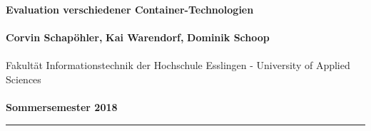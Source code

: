 \renewcommand{\footnoterule}{\hspace{-0.5cm}\rule{6cm}{1pt}{\vspace*{2pt}}}
\begin{center}
\newcommand{\SchapoehlerCorvinThema}{Evaluation verschiedener Container-Technologien}
		\baselineskip15pt
		\textbf{\textcolor{hs_dunkelblau}{\large{Evaluation verschiedener Container-Technologien}}}\\\ \\
		\baselineskip10pt
\newcommand{\SchapoehlerCorvin}{Corvin \newline Schapöhler}
		\textbf{\textcolor{hs_dunkelblau}{Corvin Schapöhler\label{SchapoehlerCorvin},}\hspace{.5cm}}
\textbf{\textcolor{hs_dunkelblau}{
Kai Warendorf,}}
\hspace{.5cm}\textbf{\textcolor{hs_dunkelblau}{
Dominik Schoop}}
\textcolor{hs_dunkelblau}{\\\ \\Fakultät Informationstechnik der Hochschule Esslingen - University of Applied Sciences}\\\ \\
\textcolor{hs_dunkelblau}{\textbf{Sommersemester 2018}}
\color{hs_dunkelblau}\rule{\linewidth}{1.5pt}
\end{center}
\setcounter{figure}{0}
\renewcommand{\bildI}{
 \begin{center}
 \begin{minipage}[t]{\linewidth}
 \begin{center}
  \includegraphics*[width=\linewidth, scale=1.1]
{../tmp/SchapoehlerCorvin/Corvin_Schapoehler_Bild01.png}
  \captionof{figure}{\fontspec{Lucida Sans} \footnotesize Virtualisierung durch VMs (links) im vergleich zu Isolation durch Container (recht)}
  \end{center}
  \end{minipage}
 \end{center}
}


